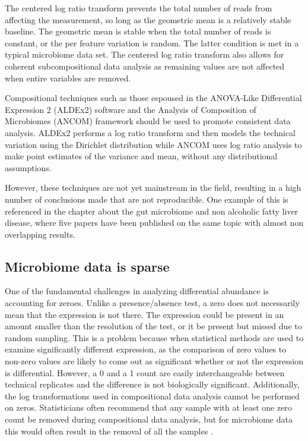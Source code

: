 The centered log ratio transform prevents the total number of reads from affecting the measurement, so long as the geometric mean is a relatively stable baseline. The geometric mean is stable when the total number of reads is constant, or the per feature variation is random. The latter condition is met in a typical microbiome data set. The centered log ratio transform also allows for coherent subcompositional data analysis as remaining values are not affected when entire variables are removed.

Compositional techniques such as those espoused in the ANOVA-Like Differential Expression 2 (ALDEx2) software \cite{fernandes2014unifying} and the Analysis of Composition of Microbiomes (ANCOM) framework \cite{mandal2015analysis} should be used to promote consistent data analysis. ALDEx2 performs a log ratio transform and then models the technical variation using the Dirichlet distribution while ANCOM uses log ratio analysis to make point estimates of the variance and mean, without any distributional assumptions.

However, these techniques are not yet mainstream in the field, resulting in a high number of conclusions made that are not reproducible. One example of this is referenced in the chapter about the gut microbiome and non alcoholic fatty liver disease, where five papers have been published on the same topic with almost non overlapping results.

\subsection{Microbiome data is sparse}
One of the fundamental challenges in analyzing differential abundance is accounting for zeroes. Unlike a presence/absence test, a zero does not necessarily mean that the expression is not there. The expression could be present in an amount smaller than the resolution of the test, or it be present but missed due to random sampling. This is a problem because when statistical methods are used to examine significantly different expression, as the comparison of zero values to non-zero values are likely to come out as significant whether or not the expression is differential. However, a 0 and a 1 count are easily interchangeable between technical replicates and the difference is not biologically significant. Additionally, the log transformations used in compositional data analysis cannot be performed on zeros. Statisticians often recommend that any sample with at least one zero count be removed during compositional data analysis, but for microbiome data this would often result in the removal of all the samples \cite{aitchison1982statistical}.

